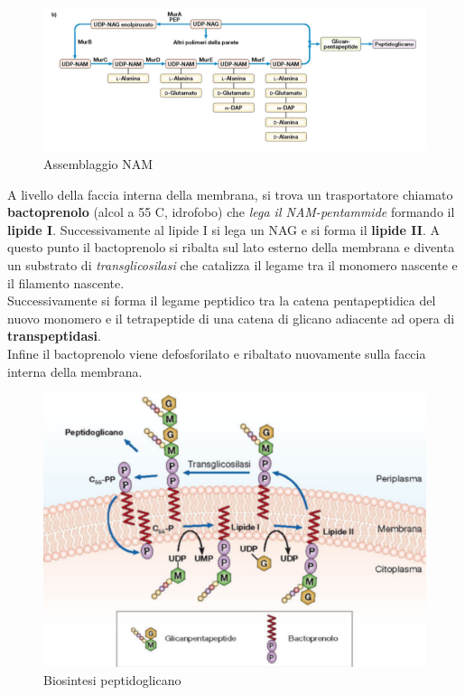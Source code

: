 \documentclass[11pt]{book}
\begin{document}
\begin{figure}[htp]
\centering
\includegraphics[scale=0.4]{img/Assemblaggio NAM.png}
\caption{Assemblaggio NAM}
\label{}
\end{figure}

A livello della faccia interna della membrana, si trova un trasportatore chiamato \textbf{bactoprenolo} (alcol a 55 C, idrofobo) che \emph{lega il NAM-pentammide} formando il \textbf{lipide I}. Successivamente al lipide I si lega un NAG e si forma il \textbf{lipide II}. A questo punto il bactoprenolo si ribalta sul lato esterno della membrana e diventa un substrato di \emph{transglicosilasi} che catalizza il legame tra il monomero nascente e il filamento nascente.\\
Successivamente si forma il legame peptidico tra la catena pentapeptidica del nuovo monomero e il tetrapeptide di una catena di glicano adiacente ad opera di \textbf{transpeptidasi}. \\
Infine il bactoprenolo viene defosforilato e ribaltato nuovamente sulla faccia interna della membrana.

\begin{figure}[htp]
\centering
\includegraphics[scale=0.5]{img/Biosintesi peptidoglicano.png}
\caption{Biosintesi peptidoglicano}
\label{}
\end{figure}
\end{document}
